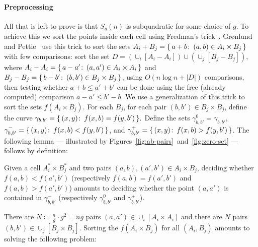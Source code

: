 \paragraph{Preprocessing} All that is left to prove is that $S_g(n)$ is
subquadratic for some choice of $g$. To achieve this we sort the points
inside each cell using Fredman's trick~\cite{Fr76}. Gr\o nlund and
Pettie~\cite{GP18} use this trick to sort the sets
$A_i + B_j = \{\,a + b \colon\, (a,b) \in A_i \times B_j \,\}$
with few comparisons: sort the set
$D = (\cup_i [A_i - A_i]) \cup (\cup_j [B_j - B_j])$,
where
$A_i - A_i = \{\,a - a' \colon\, (a,a')\in A_i \times A_i \,\}$
and
$B_j - B_j = \{\,b - b' \colon\, (b,b')\in B_j \times B_j \,\}$,
using $O(n\log n + |D|)$ comparisons, then testing whether
$a + b \le a' + b'$
can be done using the free (already computed) comparison
$a - a' \le b' - b$.
We use a generalization of this trick to sort the sets $f(A_i\times B_j)$.
For each $B_j$, for each pair \((b,b') \in B_j \times B_j\),
define the curve
$
	\gamma_{b,b'} = \{\,(x,y) \colon\, f(x,b) = f(y,b')\,\}.
$
Define the sets
$\gamma^0_{b,b'} = \gamma_{b,b'}$,
$\gamma^-_{b,b'} = \{\,(x,y) \colon\, f(x,b) < f(y,b')\,\}$, and
$\gamma^+_{b,b'} = \{\,(x,y) \colon\, f(x,b) > f(y,b')\,\}$.
%
The following lemma --- illustrated by
Figures~\ref{fig:ab-pairs}~and~\ref{fig:zero-set} --- follows by definition:
\begin{lemma}\label{lem:fredman}
Given a cell $A_i^* \times B_j^*$ and two pairs \((a,b), (a',b') \in A_i \times B_j\),
deciding whether \(f(a,b) < f(a',b')\) (respectively
$f(a,b) = f(a',b')$
and
$f(a,b) > f(a',b')$)
amounts to deciding whether the point
$(a,a')$ is contained in \(\gamma^-_{b,b'}\) (respectively
\(\gamma^0_{b,b'}\) and
\(\gamma^+_{b,b'}\)).
\end{lemma}

There are $N \coloneqq \frac ng \cdot g^2 = ng$ pairs $(a,a') \in \cup_i [A_i \times
A_i]$ and there are $N$ pairs $(b,b') \in \cup_j [B_j \times B_j]$.  Sorting
the $f(A_i\times B_j)$ for all $(A_i, B_j)$ amounts to solving the
following problem:
%


